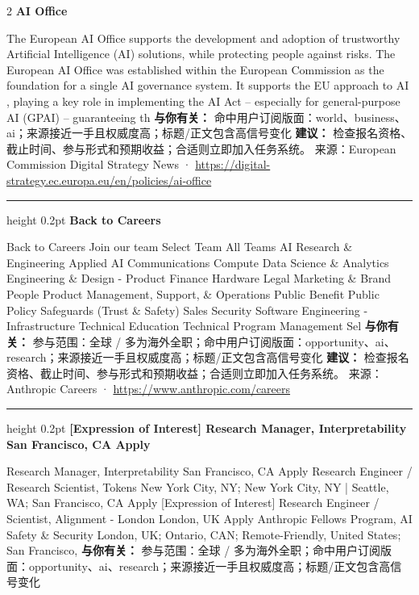 \documentclass[10.5pt]{ctexart}
\begin{document}
\begin{multicols}{2}
{\large\bfseries AI Office}\par
The European AI Office supports the development and adoption of trustworthy Artificial Intelligence (AI) solutions, while protecting people against risks. The European AI Office was established within the European Commission as the foundation for a single AI governance system. It supports the EU approach to AI , playing a key role in implementing the AI Act – especially for general-purpose AI (GPAI) – guaranteeing th
\textbf{与你有关：} 命中用户订阅版面：world、business、ai；来源接近一手且权威度高；标题/正文包含高信号变化
\textbf{建议：} 检查报名资格、截止时间、参与形式和预期收益；合适则立即加入任务系统。
{\footnotesize\color{ormuted} 来源：European Commission Digital Strategy News · \url{https://digital-strategy.ec.europa.eu/en/policies/ai-office}}
\vspace{2mm}
\hrule height 0.2pt
\vspace{2mm}
{\large\bfseries Back to Careers}\par
Back to Careers Join our team Select Team All Teams AI Research \& Engineering Applied AI Communications Compute Data Science \& Analytics Engineering \& Design - Product Finance Hardware Legal Marketing \& Brand People Product Management, Support, \& Operations Public Benefit Public Policy Safeguards (Trust \& Safety) Sales Security Software Engineering - Infrastructure Technical Education Technical Program Management Sel
\textbf{与你有关：} 参与范围：全球 / 多为海外全职；命中用户订阅版面：opportunity、ai、research；来源接近一手且权威度高；标题/正文包含高信号变化
\textbf{建议：} 检查报名资格、截止时间、参与形式和预期收益；合适则立即加入任务系统。
{\footnotesize\color{ormuted} 来源：Anthropic Careers · \url{https://www.anthropic.com/careers}}
\vspace{2mm}
\hrule height 0.2pt
\vspace{2mm}
{\large\bfseries [Expression of Interest] Research Manager, Interpretability San Francisco, CA Apply}\par
[Expression of Interest] Research Manager, Interpretability San Francisco, CA Apply Research Engineer / Research Scientist, Tokens New York City, NY; New York City, NY | Seattle, WA; San Francisco, CA Apply [Expression of Interest] Research Engineer / Scientist, Alignment - London London, UK Apply Anthropic Fellows Program, AI Safety \& Security London, UK; Ontario, CAN; Remote-Friendly, United States; San Francisco, 
\textbf{与你有关：} 参与范围：全球 / 多为海外全职；命中用户订阅版面：opportunity、ai、research；来源接近一手且权威度高；标题/正文包含高信号变化

\end{multicols}
\end{document}
